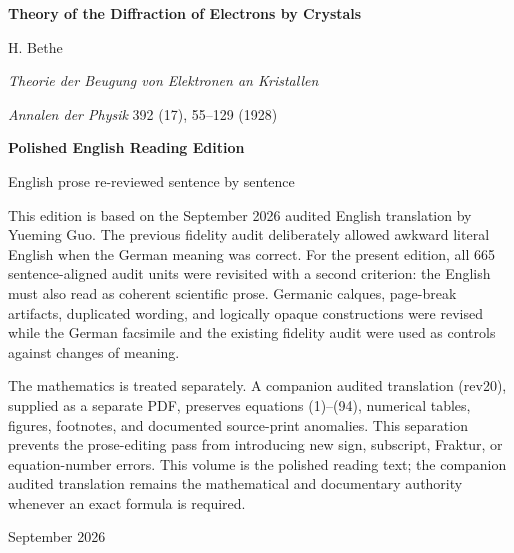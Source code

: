 \documentclass[10pt]{article}
\begin{document}
\begin{titlepage}\centering
\vspace*{0.78in}
{\Huge\bfseries Theory of the Diffraction of Electrons by Crystals\par}\vspace{0.20in}
{\Large H. Bethe\par}\vspace{0.10in}
{\large \textit{Theorie der Beugung von Elektronen an Kristallen}\par}
{\large \textit{Annalen der Physik} 392 (17), 55--129 (1928)\par}\vspace{0.52in}
{\LARGE\bfseries Polished English Reading Edition\par}\vspace{0.16in}
{\large English prose re-reviewed sentence by sentence\par}\vfill
\begin{minipage}{0.84\textwidth}\small\justifying
This edition is based on the September 2026 audited English translation by Yueming Guo. The previous fidelity audit deliberately allowed awkward literal English when the German meaning was correct. For the present edition, all 665 sentence-aligned audit units were revisited with a second criterion: the English must also read as coherent scientific prose. Germanic calques, page-break artifacts, duplicated wording, and logically opaque constructions were revised while the German facsimile and the existing fidelity audit were used as controls against changes of meaning.

The mathematics is treated separately. A companion audited translation (rev20), supplied as a separate PDF, preserves equations (1)--(94), numerical tables, figures, footnotes, and documented source-print anomalies. This separation prevents the prose-editing pass from introducing new sign, subscript, Fraktur, or equation-number errors. This volume is the polished reading text; the companion audited translation remains the mathematical and documentary authority whenever an exact formula is required.
\end{minipage}\vfill
{\small September 2026\par}
\end{titlepage}
\end{document}
